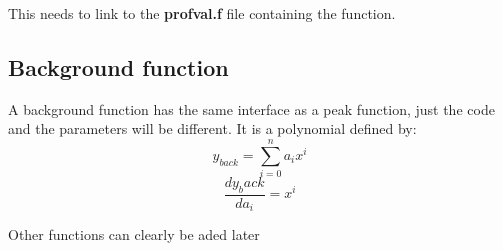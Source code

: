 \documentclass[10pt,a4paper,notitlepage]{article}
\newcommand{\code}[1]{\textbf{\textsf{#1}}} %
\begin{document}
\begin{flushleft}
\begin{minipage}{\linewidth}
\begin{list}{}{\setlength{\itemsep}{-\parsep}\setlength{\itemindent}{-\leftmargin}}
\item{}
\end{list}
\end{minipage}\vspace{4ex}
\end{flushleft}
This needs to link to the \code{profval.f} file containing the function.

\subsection{Background function}
A background function has the same interface as a peak function, just the 
code and the parameters will be different.
It is a polynomial defined by:
\[ y_{back} = \sum_{i=0}^{n} a_{i}x^{i} \]
\[ \frac{dy_back}{da_{i}} =  x^{i} \]

Other functions can clearly be aded later
\end{document}
